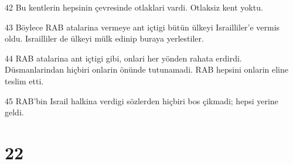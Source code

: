 \par 42 Bu kentlerin hepsinin çevresinde otlaklari vardi. Otlaksiz kent yoktu.
\par 43 Böylece RAB atalarina vermeye ant içtigi bütün ülkeyi Israilliler'e vermis oldu. Israilliler de ülkeyi mülk edinip buraya yerlestiler.
\par 44 RAB atalarina ant içtigi gibi, onlari her yönden rahata erdirdi. Düsmanlarindan hiçbiri onlarin önünde tutunamadi. RAB hepsini onlarin eline teslim etti.
\par 45 RAB'bin Israil halkina verdigi sözlerden hiçbiri bos çikmadi; hepsi yerine geldi.

\chapter{22}

